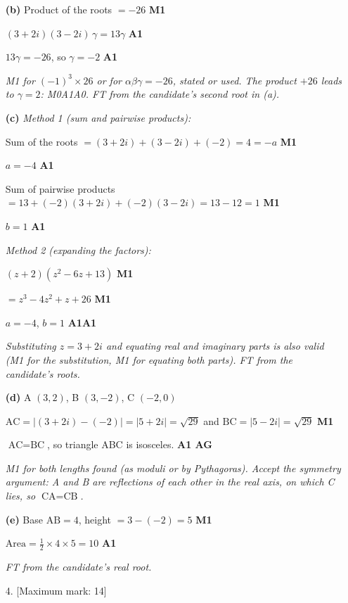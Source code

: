 \documentclass[12pt, twoside]{article}
\begin{document}
\begin{enumerate}[itemsep=0.3cm]
\textbf{(b)} Product of the roots $= -26$ \hfill \textbf{M1}

$(3 + 2i)(3 - 2i)\,\gamma = 13\gamma$ \hfill \textbf{A1}

$13\gamma = -26$, so $\gamma = -2$ \hfill \textbf{A1}

\emph{M1 for $(-1)^{3} \times 26$ or for $\alpha\beta\gamma = -26$, stated
or used. The product $+26$ leads to $\gamma = 2$: M0A1A0. FT from the
candidate's second root in (a).}

\textbf{(c)} \emph{Method 1 (sum and pairwise products):}

Sum of the roots $= (3 + 2i) + (3 - 2i) + (-2) = 4 = -a$
\hfill \textbf{M1}

$a = -4$ \hfill \textbf{A1}

Sum of pairwise products $= 13 + (-2)(3 + 2i) + (-2)(3 - 2i)
= 13 - 12 = 1$ \hfill \textbf{M1}

$b = 1$ \hfill \textbf{A1}

\emph{Method 2 (expanding the factors):}

$(z + 2)(z^{2} - 6z + 13)$ \hfill \textbf{M1}

$= z^{3} - 4z^{2} + z + 26$ \hfill \textbf{M1}

$a = -4$, \quad $b = 1$ \hfill \textbf{A1A1}

\emph{Substituting $z = 3 + 2i$ and equating real and imaginary parts is
also valid (M1 for the substitution, M1 for equating both parts). FT from
the candidate's roots.}

\textbf{(d)} A $(3, 2)$, \; B $(3, -2)$, \; C $(-2, 0)$

$\text{AC} = |(3 + 2i) - (-2)| = |5 + 2i| = \sqrt{29}$ and
$\text{BC} = |5 - 2i| = \sqrt{29}$ \hfill \textbf{M1}

$\text{AC} = \text{BC}$, so triangle ABC is isosceles. \hfill \textbf{A1 AG}

\emph{M1 for both lengths found (as moduli or by Pythagoras). Accept the
symmetry argument: A and B are reflections of each other in the real axis,
on which C lies, so $\text{CA} = \text{CB}$.}

\textbf{(e)} Base $\text{AB} = 4$, height $= 3 - (-2) = 5$
\hfill \textbf{M1}

$\text{Area} = \frac{1}{2} \times 4 \times 5 = 10$ \hfill \textbf{A1}

\emph{FT from the candidate's real root.}

\newpage

\item[4.] [Maximum mark: 14]


\end{enumerate}
\end{document}
